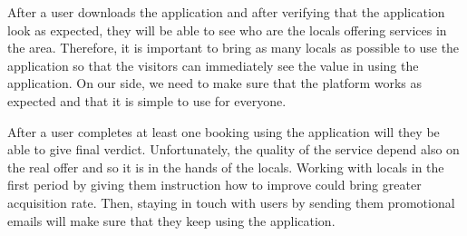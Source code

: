 After a user downloads the application and after verifying that the application look as expected, they will be able to see who are the locals offering services in the area. Therefore, it is important to bring as many locals as possible to use the application so that the visitors can immediately see the value in using the application. On our side, we need to make sure that the platform works as expected and that it is simple to use for everyone. 

After a user completes at least one booking using the application will they be able to give final verdict. Unfortunately, the quality of the service depend also on the real offer and so it is in the hands of the locals. Working with locals in the first period by giving them instruction how to improve could bring greater acquisition rate. Then, staying in touch with users by sending them promotional emails will make sure that they keep using the application.